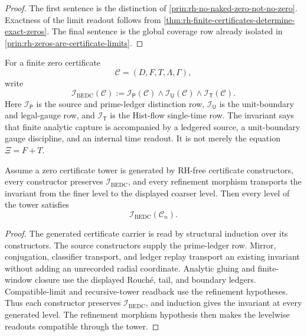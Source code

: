 \begin{proof}
The first sentence is the distinction of
\autoref{prin:rh-no-naked-zero-not-no-zero}. Exactness of the limit
readout follows from
\autoref{thm:rh-finite-certificates-determine-exact-zeros}. The final
sentence is the global coverage row already isolated in
\autoref{prin:rh-zeros-are-certificate-limits}.
\end{proof}

\begin{definition}
\label{def:rh-certificate-tower-triadic-invariant}
For a finite zero certificate
$$
\mathcal C=(D,F,T,\Lambda,\Gamma),
$$
write
$$
\mathcal I_{\mathrm{BEDC}}(\mathcal C)
:=
\mathcal I_{\mathsf P}(\mathcal C)
\wedge
\mathcal I_{\mathsf U}(\mathcal C)
\wedge
\mathcal I_{\mathsf T}(\mathcal C).
$$
Here $\mathcal I_{\mathsf P}$ is the source and prime-ledger distinction
row, $\mathcal I_{\mathsf U}$ is the unit-boundary and legal-gauge row,
and $\mathcal I_{\mathsf T}$ is the Hist-flow single-time row. The
invariant says that finite analytic capture is accompanied by a
ledgered source, a unit-boundary gauge discipline, and an internal time
readout. It is not merely the equation $\Xi=F+T$.
\end{definition}

\begin{theorem}
\label{thm:rh-generated-certificate-towers-preserve-triadic-invariant}
Assume a zero certificate tower is generated by RH-free certificate
constructors, every constructor preserves
$\mathcal I_{\mathrm{BEDC}}$, and every refinement morphism transports
the invariant from the finer level to the displayed coarser level. Then
every level of the tower satisfies
$$
\mathcal I_{\mathrm{BEDC}}(\mathcal C_n).
$$
\end{theorem}

\begin{proof}
The generated certificate carrier is read by structural induction over
its constructors. The source constructors supply the prime-ledger row.
Mirror, conjugation, classifier transport, and ledger replay transport an
existing invariant without adding an unrecorded radial coordinate.
Analytic gluing and finite-window closure use the displayed Rouch\'e,
tail, and boundary ledgers. Compatible-limit and recursive-tower
readback use the refinement hypotheses. Thus each constructor preserves
$\mathcal I_{\mathrm{BEDC}}$, and induction gives the invariant at every
generated level. The refinement morphism hypothesis then makes the
levelwise readouts compatible through the tower.
\end{proof}

